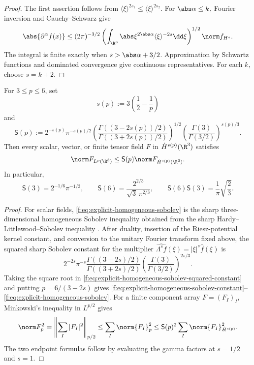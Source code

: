 \begin{proof}
The first assertion follows from
\(\langle\xi\rangle^{2s_1}\le\langle\xi\rangle^{2s_2}\).
For \(\abs\alpha\le k\), Fourier inversion and Cauchy--Schwarz give
\[
 \abs{\partial^\alpha f(x)}
 \le(2\pi)^{-3/2}
 \left(\int_{\R^3}\abs\xi^{2\abs\alpha}
 \langle\xi\rangle^{-2s}\dd\xi\right)^{1/2}
 \norm f_{H^s}.
\]
The integral is finite exactly when \(s>\abs\alpha+3/2\).
Approximation by Schwartz functions and dominated convergence give continuous
representatives.  For each \(k\), choose \(s=k+2\).
\end{proof}

\begin{lemma}
\label{f:lem:explicit-homogeneous-sobolev}
For \(3\le p\le6\), set
\[
 s(p):=3\left(\frac12-\frac1p\right)
\]
and
\begin{equation}
 \mathsf S(p):=
 2^{-s(p)}\pi^{-s(p)/2}
 \left(
  \frac{\Gamma((3-2s(p))/2)}
       {\Gamma((3+2s(p))/2)}
 \right)^{1/2}
 \left(\frac{\Gamma(3)}{\Gamma(3/2)}\right)^{s(p)/3}.
 \label{f:eq:explicit-homogeneous-sobolev-constant}
\end{equation}
Then every scalar, vector, or finite tensor field \(F\) in
\(\dot H^{s(p)}(\R^3)\) satisfies
\begin{equation}
 \norm F_{L^p(\R^3)}
 \le \mathsf S(p)\norm F_{\dot H^{s(p)}(\R^3)}.
 \label{f:eq:explicit-homogeneous-sobolev}
\end{equation}
In particular,
\[
 \mathsf S(3)=2^{-1/6}\pi^{-1/3},
 \qquad
 \mathsf S(6)=\frac{2^{2/3}}{\sqrt3\,\pi^{2/3}},
 \qquad
 \mathsf S(6)\mathsf S(3)=\frac1\pi\sqrt{\frac23}.
\]
\end{lemma}

\begin{proof}
For scalar fields, \eqref{f:eq:explicit-homogeneous-sobolev} is the sharp
three-dimensional homogeneous Sobolev inequality obtained from the sharp
Hardy--Littlewood--Sobolev inequality \cite{Lieb1983}.  After duality,
insertion of the Riesz-potential kernel constant, and conversion to the
unitary Fourier transform fixed above, the squared sharp Sobolev constant for
the multiplier
\(\widehat{\Lambda^sf}(\xi)=|\xi|^s\widehat f(\xi)\) is
\begin{equation}
 2^{-2s}\pi^{-s}
 \frac{\Gamma((3-2s)/2)}{\Gamma((3+2s)/2)}
 \left(\frac{\Gamma(3)}{\Gamma(3/2)}\right)^{2s/3}.
 \label{f:eq:explicit-homogeneous-sobolev-squared-constant}
\end{equation}
Taking the square root in
\eqref{f:eq:explicit-homogeneous-sobolev-squared-constant} and putting
\(p=6/(3-2s)\) gives
\eqref{f:eq:explicit-homogeneous-sobolev-constant}--
\eqref{f:eq:explicit-homogeneous-sobolev}.  For a finite component array
\(F=(F_I)_I\), Minkowski's inequality in \(L^{p/2}\) gives
\[
 \norm F_p^2
 =\left\|\sum_I|F_I|^2\right\|_{p/2}
 \le\sum_I\norm{F_I}_p^2
 \le\mathsf S(p)^2\sum_I\norm{F_I}_{\dot H^{s(p)}}^2.
\]
The two endpoint formulas follow by evaluating the gamma factors at
\(s=1/2\) and \(s=1\).
\end{proof}

